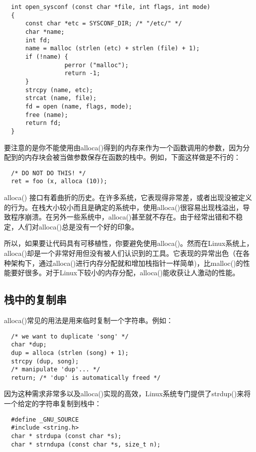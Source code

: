 \begin{lstlisting}
  int open_sysconf (const char *file, int flags, int mode)
  {
      const char *etc = SYSCONF_DIR; /* "/etc/" */
      char *name;
      int fd;
      name = malloc (strlen (etc) + strlen (file) + 1);
      if (!name) {
                 perror ("malloc");
                 return -1;
      }
      strcpy (name, etc);
      strcat (name, file);
      fd = open (name, flags, mode);
      free (name);
      return fd;
  }
\end{lstlisting}

要注意的是你不能使用由alloca()得到的内存来作为一个函数调用的参数，因为分配到的内存块会被当做参数保存在函数的栈中。例如，下面这样做是不行的： 

\begin{lstlisting}
  /* DO NOT DO THIS! */
  ret = foo (x, alloca (10));
\end{lstlisting}

alloca() 接口有着曲折的历史。在许多系统，它表现得非常差，或者出现没被定义的行为。在栈大小较小而且是确定的系统中，使用alloca()很容易出现栈溢出，导致程序崩溃。在另外一些系统中，alloca()甚至就不存在。由于经常出错和不稳定，人们对alloca()总是没有一个好的印象。

所以，如果要让代码具有可移植性，你要避免使用alloca()。然而在Linux系统上，alloca()却是一个非常好用但没有被人们认识到的工具。它表现的异常出色（在各种架构下，通过alloca()进行内存分配就和增加栈指针一样简单)，比malloc()的性能要好很多。对于Linux下较小的内存分配，alloca()能收获让人激动的性能。 

\subsection{栈中的复制串}

alloca()常见的用法是用来临时复制一个字符串。例如： 

\begin{lstlisting}
  /* we want to duplicate 'song' */
  char *dup;
  dup = alloca (strlen (song) + 1);
  strcpy (dup, song);
  /* manipulate 'dup'... */
  return; /* 'dup' is automatically freed */
\end{lstlisting}

因为这种需求非常多以及alloca()实现的高效，Linux系统专门提供了strdup()来将一个给定的字符串复制到栈中： 

\begin{lstlisting}
  #define _GNU_SOURCE
  #include <string.h>
  char * strdupa (const char *s);
  char * strndupa (const char *s, size_t n);
\end{lstlisting}

